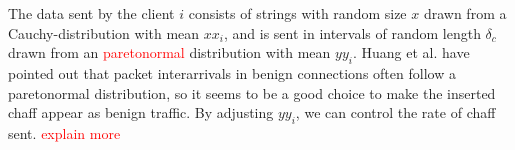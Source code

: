 \documentclass[conference]{IEEEtran}\usepackage[]{graphicx}\usepackage[]{color}
\begin{document}
The data sent by the client $i$ consists of strings with random size $x$ drawn from a Cauchy-distribution with mean $xx_i$, and is sent in intervals of random length $\delta_c$ drawn from an \textcolor{red}{paretonormal} distribution with mean $yy_i$. Huang et al. \cite{huang2011detecting} have pointed out that packet interarrivals in benign connections often follow a paretonormal distribution, so it seems to be a good choice to make the inserted chaff appear as benign traffic. By adjusting $yy_i$, we can control the rate of chaff sent. \textcolor{red}{explain more}



 






\end{document}
